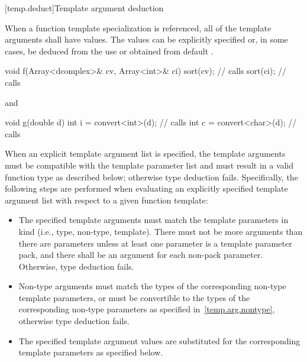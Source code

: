 [temp.deduct]{Template argument deduction}

\pnum
When a
function template
specialization is referenced, all of the
template arguments shall have values.
The values can be
explicitly specified or, in some cases, be deduced from the use
or obtained from default
.
\begin{example}

\begin{codeblock}
void f(Array<dcomplex>& cv, Array<int>& ci) {
  sort(cv);                     // calls 
  sort(ci);                     // calls 
}
\end{codeblock}

and

\begin{codeblock}
void g(double d) {
  int i = convert<int>(d);      // calls 
  int c = convert<char>(d);     // calls 
}
\end{codeblock}
\end{example}

\pnum
When an explicit template argument list is specified, the template
arguments must be compatible with the template parameter list and must
result in a valid function type as described below; otherwise type
deduction fails.  Specifically, the following steps are performed when
evaluating an explicitly specified template argument list with respect
to a given function template:

\begin{itemize}
\item The specified template arguments must match the template parameters in
kind (i.e., type, non-type, template). There
must not be more arguments than there are parameters
unless at least one parameter is a template parameter pack, and there shall be
an argument for each non-pack parameter.
Otherwise, type deduction fails.

\item Non-type arguments must match the types of the corresponding non-type
template parameters, or must be convertible to the types of the
corresponding non-type parameters as specified in~\ref{temp.arg.nontype}, otherwise type deduction fails.

\item The specified template argument values are substituted for the
corresponding template parameters as specified below.
\end{itemize}

